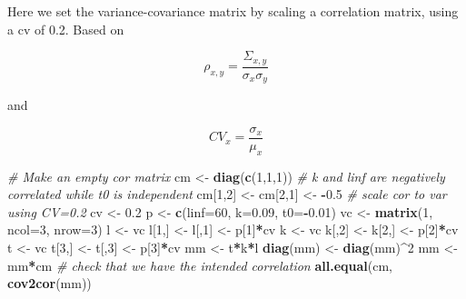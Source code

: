 \documentclass[
]{book}
\newenvironment{Shaded}{\begin{snugshade}}{\end{snugshade}}
\newcommand{\AttributeTok}[1]{\textcolor[rgb]{0.13,0.29,0.53}{#1}}
\newcommand{\CommentTok}[1]{\textcolor[rgb]{0.56,0.35,0.01}{\textit{#1}}}
\newcommand{\DecValTok}[1]{\textcolor[rgb]{0.00,0.00,0.81}{#1}}
\newcommand{\FloatTok}[1]{\textcolor[rgb]{0.00,0.00,0.81}{#1}}
\newcommand{\FunctionTok}[1]{\textcolor[rgb]{0.13,0.29,0.53}{\textbf{#1}}}
\newcommand{\NormalTok}[1]{#1}
\newcommand{\OtherTok}[1]{\textcolor[rgb]{0.56,0.35,0.01}{#1}}
\newcommand{\SpecialCharTok}[1]{\textcolor[rgb]{0.81,0.36,0.00}{\textbf{#1}}}
\begin{document}
Here we set the variance-covariance matrix by scaling a correlation matrix, using a cv of 0.2. Based on

\[\rho_{x,y}=\frac{\Sigma_{x,y}}{\sigma_x \sigma_y}\]

and

\[CV_x=\frac{\sigma_x}{\mu_x}\]

\begin{Shaded}
\begin{Highlighting}[]
\CommentTok{\# Make an empty cor matrix}
\NormalTok{cm }\OtherTok{\textless{}{-}} \FunctionTok{diag}\NormalTok{(}\FunctionTok{c}\NormalTok{(}\DecValTok{1}\NormalTok{,}\DecValTok{1}\NormalTok{,}\DecValTok{1}\NormalTok{))}
\CommentTok{\# k and linf are negatively correlated while t0 is independent}
\NormalTok{cm[}\DecValTok{1}\NormalTok{,}\DecValTok{2}\NormalTok{] }\OtherTok{\textless{}{-}}\NormalTok{ cm[}\DecValTok{2}\NormalTok{,}\DecValTok{1}\NormalTok{] }\OtherTok{\textless{}{-}} \SpecialCharTok{{-}}\FloatTok{0.5}
\CommentTok{\# scale cor to var using CV=0.2}
\NormalTok{cv }\OtherTok{\textless{}{-}} \FloatTok{0.2}
\NormalTok{p }\OtherTok{\textless{}{-}} \FunctionTok{c}\NormalTok{(}\AttributeTok{linf=}\DecValTok{60}\NormalTok{, }\AttributeTok{k=}\FloatTok{0.09}\NormalTok{, }\AttributeTok{t0=}\SpecialCharTok{{-}}\FloatTok{0.01}\NormalTok{)}
\NormalTok{vc }\OtherTok{\textless{}{-}} \FunctionTok{matrix}\NormalTok{(}\DecValTok{1}\NormalTok{, }\AttributeTok{ncol=}\DecValTok{3}\NormalTok{, }\AttributeTok{nrow=}\DecValTok{3}\NormalTok{)}
\NormalTok{l }\OtherTok{\textless{}{-}}\NormalTok{ vc}
\NormalTok{l[}\DecValTok{1}\NormalTok{,] }\OtherTok{\textless{}{-}}\NormalTok{ l[,}\DecValTok{1}\NormalTok{] }\OtherTok{\textless{}{-}}\NormalTok{ p[}\DecValTok{1}\NormalTok{]}\SpecialCharTok{*}\NormalTok{cv}
\NormalTok{k }\OtherTok{\textless{}{-}}\NormalTok{ vc}
\NormalTok{k[,}\DecValTok{2}\NormalTok{] }\OtherTok{\textless{}{-}}\NormalTok{ k[}\DecValTok{2}\NormalTok{,] }\OtherTok{\textless{}{-}}\NormalTok{ p[}\DecValTok{2}\NormalTok{]}\SpecialCharTok{*}\NormalTok{cv}
\NormalTok{t }\OtherTok{\textless{}{-}}\NormalTok{ vc}
\NormalTok{t[}\DecValTok{3}\NormalTok{,] }\OtherTok{\textless{}{-}}\NormalTok{ t[,}\DecValTok{3}\NormalTok{] }\OtherTok{\textless{}{-}}\NormalTok{ p[}\DecValTok{3}\NormalTok{]}\SpecialCharTok{*}\NormalTok{cv}
\NormalTok{mm }\OtherTok{\textless{}{-}}\NormalTok{ t}\SpecialCharTok{*}\NormalTok{k}\SpecialCharTok{*}\NormalTok{l}
\FunctionTok{diag}\NormalTok{(mm) }\OtherTok{\textless{}{-}} \FunctionTok{diag}\NormalTok{(mm)}\SpecialCharTok{\^{}}\DecValTok{2}
\NormalTok{mm }\OtherTok{\textless{}{-}}\NormalTok{ mm}\SpecialCharTok{*}\NormalTok{cm}
\CommentTok{\# check that we have the intended correlation}
\FunctionTok{all.equal}\NormalTok{(cm, }\FunctionTok{cov2cor}\NormalTok{(mm))}
\end{Highlighting}
\end{Shaded}
\end{document}
